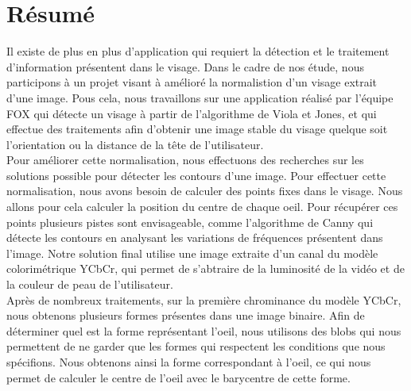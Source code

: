 \section*{Résumé}
Il existe de plus en plus d'application qui requiert la détection et le traitement d'information
présentent dans le visage. Dans le cadre de nos étude, nous participons à un projet visant
à amélioré la normalistion d'un visage extrait d'une image. Pous cela, nous travaillons
sur une application réalisé par l'équipe FOX qui détecte un visage à partir de l'algorithme de
Viola et Jones, et qui effectue des traitements afin d'obtenir une image stable du visage
quelque soit l'orientation ou la distance de la tête de l'utilisateur.\\

Pour améliorer cette normalisation, nous effectuons des recherches sur les solutions possible
pour détecter les contours d'une image. Pour effectuer cette normalisation, nous avons besoin
de calculer des points fixes dans le visage. Nous allons pour cela calculer la position du
centre de chaque oeil. Pour récupérer ces points plusieurs pistes sont envisageable, comme l'algorithme de
Canny qui détecte les contours en analysant les variations de fréquences présentent dans l'image.
Notre solution final utilise une image extraite d'un canal du modèle colorimétrique YCbCr, qui permet
de s'abtraire de la luminosité de la vidéo et de la couleur de peau de l'utilisateur.\\

Après de nombreux traitements, sur la première chrominance du modèle YCbCr, nous obtenons plusieurs
formes présentes dans une image binaire. Afin de déterminer quel est la forme représentant l'oeil,
nous utilisons des blobs qui nous permettent de ne garder que les formes qui respectent les 
conditions que nous spécifions. Nous obtenons ainsi la forme correspondant à l'oeil, ce qui nous permet 
de calculer le centre de l'oeil avec le barycentre de cette forme.


\newpage